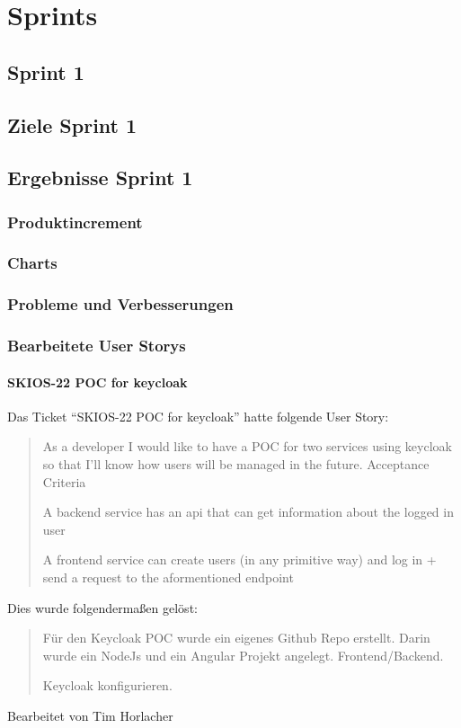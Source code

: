 
\chapter{Sprints}

\section{Sprint 1}

\section{Ziele Sprint 1}

\section{Ergebnisse Sprint 1}

\subsection{Produktincrement}
\subsection{Charts}

\subsection{Probleme und Verbesserungen}


\subsection{Bearbeitete User Storys}
\subsubsection{SKIOS-22 POC for keycloak}
Das Ticket \enquote{SKIOS-22 POC for keycloak} hatte folgende User Story:
\begin{quotation}
    As a developer I would like to have a POC for two services using keycloak so that I’ll know how users will be managed in the future.
    Acceptance Criteria

    A backend service has an api that can get information about the logged in user

    A frontend service can create users (in any primitive way) and log in + send a request to the aformentioned endpoint
\end{quotation}
Dies wurde folgendermaßen gelöst:
\begin{quotation}
    Für den Keycloak POC wurde ein eigenes Github Repo erstellt. Darin wurde ein NodeJs und ein Angular Projekt angelegt.
    Frontend/Backend.

    Keycloak konfigurieren.
\end{quotation}
Bearbeitet von Tim Horlacher


